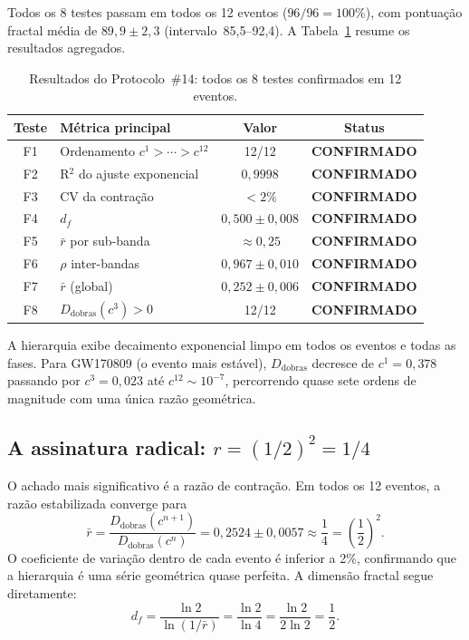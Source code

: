 \documentclass[12pt,a4paper,twocolumn]{article}
\newcommand{\confirmed}{\textcolor{tglgreen}{\textbf{CONFIRMADO}}}
\newcommand{\Dfolds}{D_{\text{dobras}}}
\begin{document}
Todos os 8 testes passam em todos os 12 eventos ($96/96 = 100\%$), com pontuação fractal média de $89{,}9 \pm 2{,}3$ (intervalo~85,5--92,4). A Tabela~\ref{tab:f14results} resume os resultados agregados.

\begin{table}[H]
\centering
\caption{Resultados do Protocolo~\#14: todos os 8 testes confirmados em 12 eventos.}
\label{tab:f14results}
\small
\begin{tabular}{@{}clcc@{}}
\toprule
Teste & Métrica principal & Valor & Status \\
\midrule
F1 & Ordenamento $c^1 > \cdots > c^{12}$ & 12/12 & \confirmed \\
F2 & R$^2$ do ajuste exponencial & $0{,}9998$ & \confirmed \\
F3 & CV da contração & $< 2\%$ & \confirmed \\
F4 & $d_f$ & $0{,}500 \pm 0{,}008$ & \confirmed \\
F5 & $\bar{r}$ por sub-banda & $\approx 0{,}25$ & \confirmed \\
F6 & $\rho$ inter-bandas & $0{,}967 \pm 0{,}010$ & \confirmed \\
F7 & $\bar{r}$ (global) & $0{,}252 \pm 0{,}006$ & \confirmed \\
F8 & $\Dfolds(c^3) > 0$ & 12/12 & \confirmed \\
\bottomrule
\end{tabular}
\end{table}

A hierarquia exibe decaimento exponencial limpo em todos os eventos e todas as fases. Para GW170809 (o evento mais estável), $\Dfolds$ decresce de $c^1 = 0{,}378$ passando por $c^3 = 0{,}023$ até $c^{12} \sim 10^{-7}$, percorrendo quase sete ordens de magnitude com uma única razão geométrica.

\subsection{A assinatura radical: $r = (1/2)^2 = 1/4$}

O achado mais significativo é a razão de contração. Em todos os 12 eventos, a razão estabilizada converge para
\begin{equation}
\bar{r} = \frac{\Dfolds(c^{n+1})}{\Dfolds(c^n)} = 0{,}2524 \pm 0{,}0057 \approx \frac{1}{4} = \left(\frac{1}{2}\right)^2.
\label{eq:radical_signature}
\end{equation}
O coeficiente de variação dentro de cada evento é inferior a 2\%, confirmando que a hierarquia é uma série geométrica quase perfeita. A dimensão fractal segue diretamente:
\begin{equation}
d_f = \frac{\ln 2}{\ln(1/\bar{r})} = \frac{\ln 2}{\ln 4} = \frac{\ln 2}{2 \ln 2} = \frac{1}{2}.
\label{eq:fractal_dim}
\end{equation}
\end{document}

